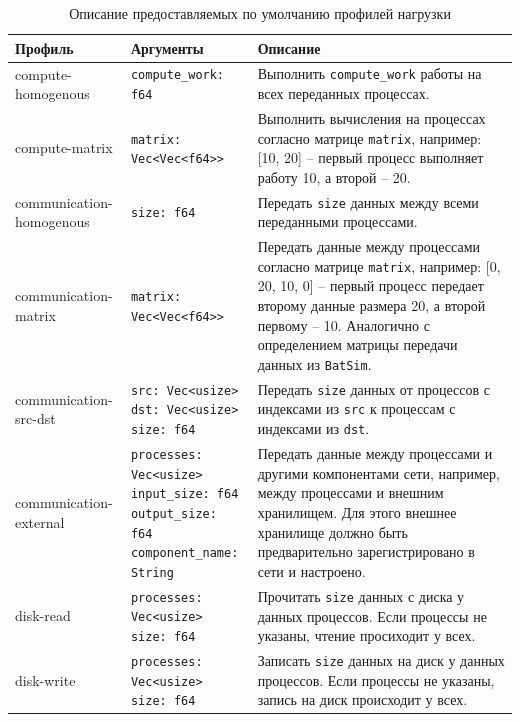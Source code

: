 \begin{table}[h!]
    \centering
    \begin{tabular}{|l|l|p{7cm}|}
        \hline
        \textbf{Профиль} & \textbf{Аргументы} & \textbf{Описание} \\ 
        \hline
        compute-homogenous & \texttt{compute\_work: f64} & Выполнить \texttt{compute\_work} работы на всех переданных процессах.\\
        \hline
        compute-matrix &  \texttt{matrix: Vec<Vec<f64>>} & Выполнить вычисления на процессах согласно матрице \texttt{matrix}, например: 
        [10, 20] -- первый процесс выполняет работу 10, а второй -- 20. \\
        \hline
        \makecell{
        communication-\\homogenous} & \texttt{size: f64} & Передать \texttt{size} данных между всеми переданными процессами. \\
        \hline 
        communication-matrix &  \texttt{matrix: Vec<Vec<f64>>}  & Передать данные между процессами согласно матрице \texttt{matrix}, например: 
        [0, 20,
        10, 0] -- первый процесс передает второму данные размера 20, а второй первому -- 10. Аналогично с определением матрицы передачи данных из \texttt{BatSim}\cite{batsim-profile-types-overview}. \\
        \hline
        communication-src-dst & \makecell[tl]{
              \texttt{src: Vec<usize>} \\ \texttt{dst: Vec<usize>} \\ \texttt{size: f64} }
         & Передать \texttt{size} данных от процессов с индексами из \texttt{src} к процессам с индексами из \texttt{dst}. \\
        \hline
        \makecell{communication-\\external} & \makecell[tl]{
             \texttt{processes: Vec<usize>}\\ \texttt{input\_size: f64}\\ \texttt{output\_size: f64}\\ \texttt{component\_name: String}} & Передать данные между процессами и другими компонентами сети, например, между процессами и внешним хранилищем. Для этого внешнее хранилище должно быть предварительно зарегистрировано в сети и настроено. \\
            \hline
        disk-read & \makecell[tl]{ \texttt{processes: Vec<usize>}\\ \texttt{size: f64}} & Прочитать \texttt{size} данных с диска у данных процессов. Если процессы не указаны, чтение просиходит у всех. \\
        \hline
        disk-write & \makecell[tl]{\texttt{processes: Vec<usize>}\\\texttt{size: f64}}  & Записать \texttt{size} данных на диск у данных процессов. Если процессы не указаны, запись на диск происходит у всех. \\
        \hline
    \end{tabular}
    \caption{Описание предоставляемых по умолчанию профилей нагрузки}
    \label{tab:default-profiles}
\end{table}


